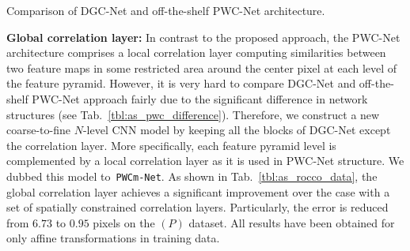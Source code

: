\documentclass[10pt,twocolumn,letterpaper]{article}
\begin{document}
\begin{table}[h!]
    \begin{subtable}[h]{.49\textwidth}
    \centering
        \vspace{-2mm}
        \caption{Comparison of DGC-Net and off-the-shelf PWC-Net architecture.}\label{tbl:as_pwc_difference}
        \end{subtable}
        \vspace{-2mm}
        \caption{\textbf{Ablation study.} We analyze the influence of different design choices of the proposed method. See Sec.~\ref{ssec:ablation_study} for more details. } \label{tbl:ablation_study}
\end{table}


\noindent\textbf{Global correlation layer:} In contrast to the proposed approach, the PWC-Net architecture comprises a local correlation layer computing similarities between two feature maps in some restricted area around the center pixel at each level of the feature pyramid. However, it is very hard to compare DGC-Net and off-the-shelf PWC-Net approach fairly due to the significant difference in network structures (see Tab.~\ref{tbl:as_pwc_difference}). Therefore, we construct a new coarse-to-fine $N$-level CNN model by keeping all the blocks of DGC-Net except the correlation layer. More specifically, each feature pyramid level is complemented by a local correlation layer as it is used in PWC-Net structure. We dubbed this model to~\texttt{PWCm-Net}. As shown in Tab.~\ref{tbl:as_rocco_data}, the global correlation layer achieves a significant improvement over the case with a set of spatially constrained correlation layers. 
Particularly, the error is reduced from $6.73$ to $0.95$ pixels on the $(P)$ dataset. All results have been obtained for only affine transformations in training data.
\end{document}
